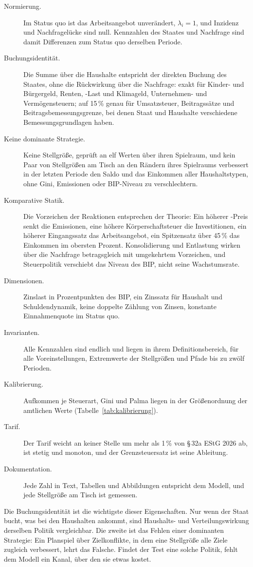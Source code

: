 \begin{description}
\item[Normierung.] Im Status quo ist das Arbeitsangebot unverändert,
  $\lambda_i = 1$, und Inzidenz und Nachfragelücke sind null. Kennzahlen des
  Staates und Nachfrage sind damit Differenzen zum Status quo derselben Periode.
\item[Buchungsidentität.] Die Summe über die Haushalte entspricht der direkten
  Buchung des Staates, ohne die Rückwirkung über die Nachfrage: exakt für
  Kinder- und Bürgergeld, Renten, \COz-Last und Klimageld, Unternehmen- und
  Vermögensteuern; auf 15\,\% genau für Umsatzsteuer, Beitragssätze und
  Beitragsbemessungsgrenze, bei denen Staat und Haushalte verschiedene
  Bemessungsgrundlagen haben.
\item[Keine dominante Strategie.] Keine Stellgröße, geprüft an elf Werten über
  ihren Spielraum, und kein Paar von Stellgrößen am Tisch an den Rändern ihres
  Spielraums verbessert in der letzten Periode den Saldo und das Einkommen aller
  Haushaltstypen, ohne Gini, Emissionen oder BIP-Niveau zu verschlechtern.
\item[Komparative Statik.] Die Vorzeichen der Reaktionen entsprechen der
  Theorie: Ein höherer \COz-Preis senkt die Emissionen, eine höhere
  Körperschaftsteuer die Investitionen, ein höherer Eingangssatz das
  Arbeitsangebot, ein Spitzensatz über 45\,\% das Einkommen im obersten Prozent.
  Konsolidierung und Entlastung wirken über die Nachfrage betragsgleich mit
  umgekehrtem Vorzeichen, und Steuerpolitik verschiebt das Niveau des BIP, nicht
  seine Wachstumsrate.
\item[Dimensionen.] Zinslast in Prozentpunkten des BIP, ein Zinssatz für
  Haushalt und Schuldendynamik, keine doppelte Zählung von Zinsen, konstante
  Einnahmenquote im Status quo.
\item[Invarianten.] Alle Kennzahlen sind endlich und liegen in ihrem
  Definitionsbereich, für alle Voreinstellungen, Extremwerte der Stellgrößen
  und Pfade bis zu zwölf Perioden.
\item[Kalibrierung.] Aufkommen je Steuerart, Gini und Palma liegen in der
  Größenordnung der amtlichen Werte (Tabelle~\ref{tab:kalibrierung}).
\item[Tarif.] Der Tarif weicht an keiner Stelle um mehr als 1\,\% von §\,32a
  EStG 2026 ab, ist stetig und monoton, und der Grenzsteuersatz ist seine
  Ableitung.
\item[Dokumentation.] Jede Zahl in Text, Tabellen und Abbildungen entspricht
  dem Modell, und jede Stellgröße am Tisch ist gemessen.
\end{description}

Die Buchungsidentität ist die wichtigste dieser Eigenschaften. Nur wenn der
Staat bucht, was bei den Haushalten ankommt, sind Haushalts- und
Verteilungswirkung derselben Politik vergleichbar. Die zweite ist das Fehlen
einer dominanten Strategie: Ein Planspiel über Zielkonflikte, in dem eine
Stellgröße alle Ziele zugleich verbessert, lehrt das Falsche. Findet der Test
eine solche Politik, fehlt dem Modell ein Kanal, über den sie etwas kostet.
